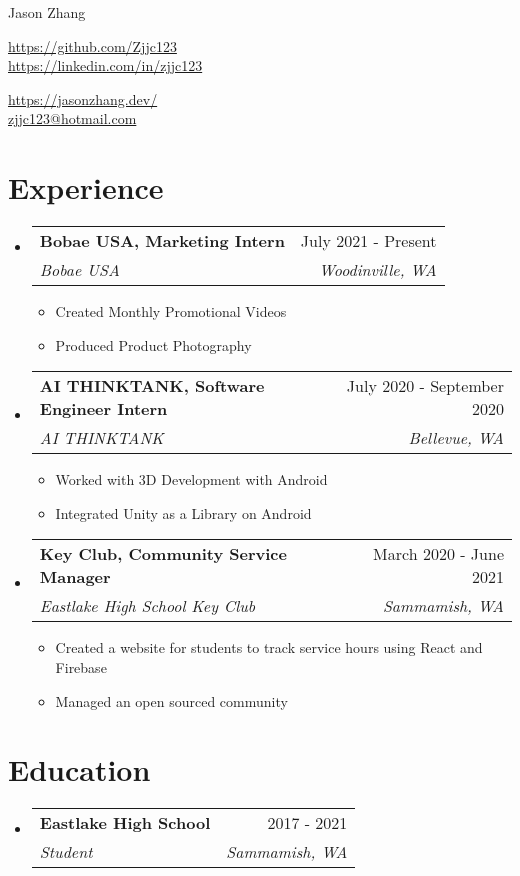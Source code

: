 \documentclass[letterpaper,10pt]{article}
\makeatletter
\newcommand{\resumeItem}[1]{
  \item\small{
    {#1 \vspace{-2pt}}
  }
}
\newcommand{\resumeSubheading}[4]{
  \vspace{-2pt}\item
    \begin{tabular*}{0.97\textwidth}[t]{l@{\extracolsep{\fill}}r}
      \textbf{#1} & #2 \\
      \textit{\small#3} & \textit{\small #4} \\
    \end{tabular*}\vspace{-7pt}
}
\newcommand{\resumeSubHeadingListStart}{\begin{itemize}[leftmargin=0.15in, label={}]}
\newcommand{\resumeSubHeadingListEnd}{\end{itemize}}
\newcommand{\resumeItemListStart}{\begin{itemize}}
\newcommand{\resumeItemListEnd}{\end{itemize}\vspace{-5pt}}
\makeatother
\begin{document}
\begin{center}
    {\large Jason Zhang} \\ \vspace{-2pt}
    \begin{multicols}{2}
    \begin{flushleft}
    \href{{your github page link}}{https://github.com/Zjjc123}\\
    \href{{your linkedin page link}}{https://linkedin.com/in/zjjc123}
    \end{flushleft}

    \begin{flushright}
    \href{{your personal websit link}}{https://jasonzhang.dev/}\\
    \href{mailto:{your email adress}}{zjjc123@hotmail.com}
    \end{flushright}
    \end{multicols}
\end{center}
\vspace{-15pt}
\section{Experience}
  \resumeSubHeadingListStart
    \resumeSubheading
      {Bobae USA, Marketing Intern}{July 2021 - Present}
      {Bobae USA}{Woodinville, WA}
      \resumeItemListStart
        \resumeItem{Created Monthly Promotional Videos}
        \resumeItem{Produced Product Photography}
    \resumeItemListEnd
  \resumeSubHeadingListEnd
\vspace{-5pt}
  \resumeSubHeadingListStart
    \resumeSubheading
      {AI THINKTANK, Software Engineer Intern}{July 2020 - September 2020}
      {AI THINKTANK}{Bellevue, WA}
      \resumeItemListStart
        \resumeItem{Worked with 3D Development with Android}
        \resumeItem{Integrated Unity as a Library on Android}
    \resumeItemListEnd
  \resumeSubHeadingListEnd
\vspace{-5pt}
  \resumeSubHeadingListStart
    \resumeSubheading
      {Key Club, Community Service Manager}{March 2020 - June 2021}
      {Eastlake High School Key Club}{Sammamish, WA}
      \resumeItemListStart
        \resumeItem{Created a website for students to track service hours using React and Firebase}
        \resumeItem{Managed an open sourced community}
    \resumeItemListEnd
  \resumeSubHeadingListEnd
\vspace{-5pt}
\section{Education}
  \resumeSubHeadingListStart
    \resumeSubheading
      {Eastlake High School}{2017 - 2021}
      {Student}{Sammamish, WA}
  \resumeSubHeadingListEnd
\end{document}
